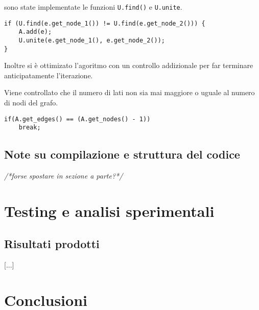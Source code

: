 \documentclass[]{article}
\begin{document}
\begin{flushleft}
\smallskip
sono state implementate le funzioni \verb|U.find()| e \verb|U.unite|.

\lstset{language=c++, style=mystyle, firstnumber=9} 	 	
\begin{lstlisting}
if (U.find(e.get_node_1()) != U.find(e.get_node_2())) {
	A.add(e);
    U.unite(e.get_node_1(), e.get_node_2());
}
\end{lstlisting}

\medskip
Inoltre si è ottimizato l'agoritmo con un controllo addizionale per far terminare anticipatamente l'iterazione. 

Viene controllato che il numero di lati non sia mai maggiore o uguale al numero di nodi del grafo.

\lstset{language=c++, style=mystyle, firstnumber=13}
\begin{lstlisting}
if(A.get_edges() == (A.get_nodes() - 1))
    break;
\end{lstlisting}
\end{flushleft}
\subsection{Note su compilazione e struttura del codice}
\textit{/*forse spostare in sezione a parte?*/}
\section{Testing e analisi sperimentali}
\subsection{Risultati prodotti}
[...]
\section{Conclusioni}
\end{document}
